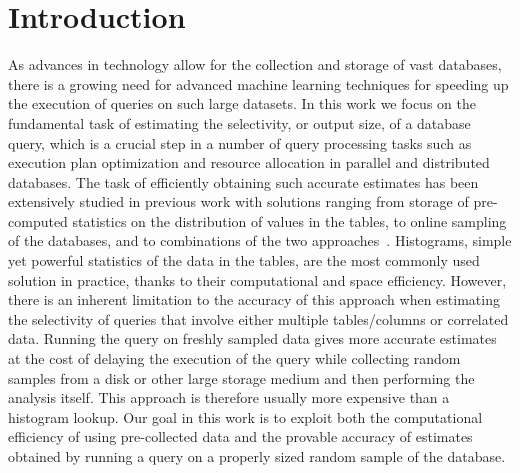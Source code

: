 \section{Introduction}\label{sec:vcfreqintro}
As advances in technology allow for the collection and storage of vast
databases, there is a growing need for advanced machine learning techniques for
speeding up the execution of queries on such large datasets. In this work we
focus on the fundamental task of estimating the selectivity, or output size, of
a database query, which is a crucial step in a number of query processing tasks
such as execution plan optimization and resource allocation in parallel and
distributed databases. The task of efficiently obtaining such accurate estimates
has been extensively studied in previous work with solutions ranging from
storage of pre-computed statistics on the distribution of values in the tables,
to online sampling of the databases, and to combinations of the two
approaches~\citep{LiptonN95,LiptonNS90,HaasS92,HouOD91,HaasS95,GangulyGMS96,GantiLR00,GibbonsM98,HouOT88,LarsonLZZ07,PoosalaI97}.
Histograms, simple yet powerful statistics of the data in the tables, are the most
commonly used solution in practice, thanks to their computational and space
efficiency. However, there is an inherent limitation to the accuracy of this
approach when estimating the selectivity of queries that involve either multiple
tables/columns or correlated data. Running the query on freshly sampled data
gives more accurate estimates at the cost of delaying the execution of the query
while collecting random samples from a disk or other large storage medium and
then performing the analysis itself. This approach is therefore usually more
expensive than a histogram lookup. Our goal in this work is to exploit both the
computational efficiency of using pre-collected data and the provable accuracy
of estimates obtained by running a query on a properly sized random sample of
the database.

